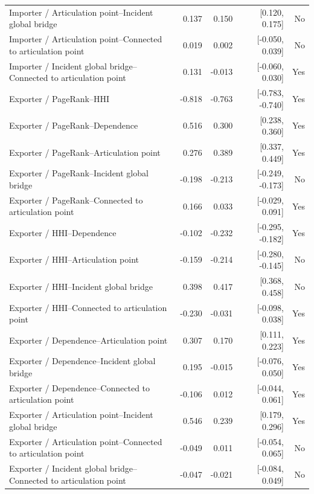 \documentclass[pdftex,12pt,openright,a4paper,oneside]{book}
\begin{document}
\begin{longtable}{@{}p{}rrrr@{}}
Importer / Articulation point--Incident global bridge & 0.137 & 0.150 & [0.120, 0.175] & No \\

Importer / Articulation point--Connected to articulation point & 0.019 & 0.002 & [-0.050, 0.039] & No \\

Importer / Incident global bridge--Connected to articulation point & 0.131 & -0.013 & [-0.060, 0.030] & Yes \\

Exporter / PageRank--HHI & -0.818 & -0.763 & [-0.783, -0.740] & Yes \\

Exporter / PageRank--Dependence & 0.516 & 0.300 & [0.238, 0.360] & Yes \\

Exporter / PageRank--Articulation point & 0.276 & 0.389 & [0.337, 0.449] & Yes \\

Exporter / PageRank--Incident global bridge & -0.198 & -0.213 & [-0.249, -0.173] & No \\

Exporter / PageRank--Connected to articulation point & 0.166 & 0.033 & [-0.029, 0.091] & Yes \\

Exporter / HHI--Dependence & -0.102 & -0.232 & [-0.295, -0.182] & Yes \\

Exporter / HHI--Articulation point & -0.159 & -0.214 & [-0.280, -0.145] & No \\

Exporter / HHI--Incident global bridge & 0.398 & 0.417 & [0.368, 0.458] & No \\

Exporter / HHI--Connected to articulation point & -0.230 & -0.031 & [-0.098, 0.038] & Yes \\

Exporter / Dependence--Articulation point & 0.307 & 0.170 & [0.111, 0.223] & Yes \\

Exporter / Dependence--Incident global bridge & 0.195 & -0.015 & [-0.076, 0.050] & Yes \\

Exporter / Dependence--Connected to articulation point & -0.106 & 0.012 & [-0.044, 0.061] & Yes \\

Exporter / Articulation point--Incident global bridge & 0.546 & 0.239 & [0.179, 0.296] & Yes \\

Exporter / Articulation point--Connected to articulation point & -0.049 & 0.011 & [-0.054, 0.065] & No \\

Exporter / Incident global bridge--Connected to articulation point & -0.047 & -0.021 & [-0.084, 0.049] & No \\

\bottomrule\end{longtable}
\end{document}
